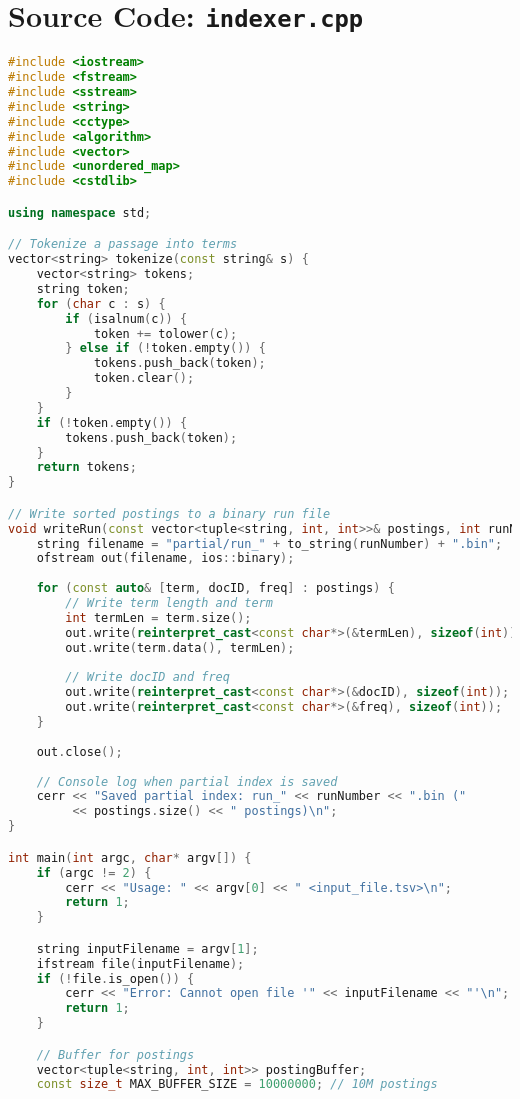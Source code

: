 \documentclass[11pt, a4paper]{report}
\begin{document}
\section{Source Code: \texttt{indexer.cpp}}
\begin{lstlisting}[language=C++, caption={The complete source code for the indexer component.}, label={lst:indexer}]
#include <iostream>
#include <fstream>
#include <sstream>
#include <string>
#include <cctype>
#include <algorithm>
#include <vector>
#include <unordered_map>
#include <cstdlib>

using namespace std;

// Tokenize a passage into terms
vector<string> tokenize(const string& s) {
    vector<string> tokens;
    string token;
    for (char c : s) {
        if (isalnum(c)) {
            token += tolower(c);
        } else if (!token.empty()) {
            tokens.push_back(token);
            token.clear();
        }
    }
    if (!token.empty()) {
        tokens.push_back(token);
    }
    return tokens;
}

// Write sorted postings to a binary run file
void writeRun(const vector<tuple<string, int, int>>& postings, int runNumber) {
    string filename = "partial/run_" + to_string(runNumber) + ".bin";
    ofstream out(filename, ios::binary);
    
    for (const auto& [term, docID, freq] : postings) {
        // Write term length and term
        int termLen = term.size();
        out.write(reinterpret_cast<const char*>(&termLen), sizeof(int));
        out.write(term.data(), termLen);
        
        // Write docID and freq
        out.write(reinterpret_cast<const char*>(&docID), sizeof(int));
        out.write(reinterpret_cast<const char*>(&freq), sizeof(int));
    }
    
    out.close();
    
    // Console log when partial index is saved
    cerr << "Saved partial index: run_" << runNumber << ".bin (" 
         << postings.size() << " postings)\n";
}

int main(int argc, char* argv[]) {
    if (argc != 2) {
        cerr << "Usage: " << argv[0] << " <input_file.tsv>\n";
        return 1;
    }

    string inputFilename = argv[1];
    ifstream file(inputFilename);
    if (!file.is_open()) {
        cerr << "Error: Cannot open file '" << inputFilename << "'\n";
        return 1;
    }

    // Buffer for postings
    vector<tuple<string, int, int>> postingBuffer;
    const size_t MAX_BUFFER_SIZE = 10000000; // 10M postings
    

\end{lstlisting}
\end{document}
